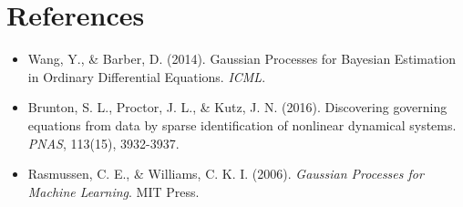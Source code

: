 \documentclass[11pt]{article}
\begin{document}
\section{References}

\begin{itemize}
    \item Wang, Y., \& Barber, D. (2014). Gaussian Processes for Bayesian Estimation in Ordinary Differential Equations. \textit{ICML}.
    \item Brunton, S. L., Proctor, J. L., \& Kutz, J. N. (2016). Discovering governing equations from data by sparse identification of nonlinear dynamical systems. \textit{PNAS}, 113(15), 3932-3937.
    \item Rasmussen, C. E., \& Williams, C. K. I. (2006). \textit{Gaussian Processes for Machine Learning}. MIT Press.
\end{itemize}
\end{document}
